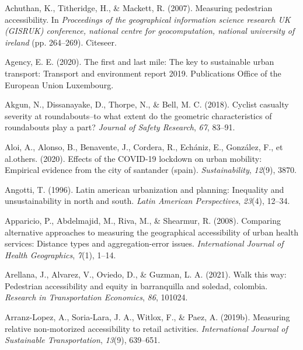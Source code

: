\documentclass[
11pt, %
oneside, %
english, %
singlespacing, %
]{macthesis} %
\newlength{\cslhangindent}
\newenvironment{CSLReferences}[2] %
{\begin{list}{}{%
	\setlength{\itemindent}{0pt}
	\setlength{\leftmargin}{0pt}
	\setlength{\parsep}{0pt}
	\ifodd #1
	\setlength{\leftmargin}{\cslhangindent}
	\setlength{\itemindent}{-1\cslhangindent}
	\fi
	\setlength{\itemsep}{#2\baselineskip}}}
{\end{list}}
\begin{document}
\label{refs}
\begin{CSLReferences}{1}{0}
Achuthan, K., Titheridge, H., \& Mackett, R. (2007). Measuring pedestrian accessibility. In \emph{Proceedings of the geographical information science research UK (GISRUK) conference, national centre for geocomputation, national university of ireland} (pp. 264--269). Citeseer.

Agency, E. E. (2020). The first and last mile: The key to sustainable urban transport: Transport and environment report 2019. Publications Office of the European Union Luxembourg.

Akgun, N., Dissanayake, D., Thorpe, N., \& Bell, M. C. (2018). Cyclist casualty severity at roundabouts--to what extent do the geometric characteristics of roundabouts play a part? \emph{Journal of Safety Research}, \emph{67}, 83--91.

Aloi, A., Alonso, B., Benavente, J., Cordera, R., Echániz, E., González, F., et al.others. (2020). Effects of the COVID-19 lockdown on urban mobility: Empirical evidence from the city of santander (spain). \emph{Sustainability}, \emph{12}(9), 3870.

Angotti, T. (1996). Latin american urbanization and planning: Inequality and unsustainability in north and south. \emph{Latin American Perspectives}, \emph{23}(4), 12--34.

Apparicio, P., Abdelmajid, M., Riva, M., \& Shearmur, R. (2008). Comparing alternative approaches to measuring the geographical accessibility of urban health services: Distance types and aggregation-error issues. \emph{International Journal of Health Geographics}, \emph{7}(1), 1--14.

Arellana, J., Alvarez, V., Oviedo, D., \& Guzman, L. A. (2021). Walk this way: Pedestrian accessibility and equity in barranquilla and soledad, colombia. \emph{Research in Transportation Economics}, \emph{86}, 101024.

Arranz-Lopez, A., Soria-Lara, J. A., Witlox, F., \& Paez, A. (2019b). Measuring relative non-motorized accessibility to retail activities. \emph{International Journal of Sustainable Transportation}, \emph{13}(9), 639--651.


\end{CSLReferences}
\end{document}
